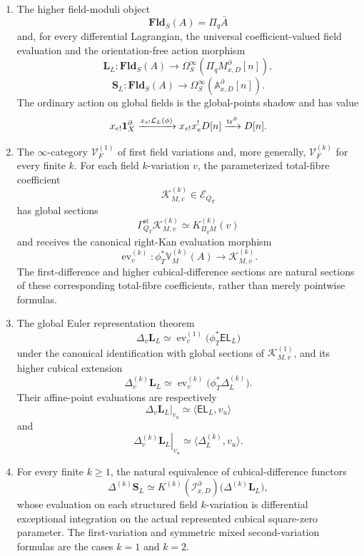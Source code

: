 \begin{theorem}
\begin{enumerate}
\item The higher field-moduli object
\[
    \mathbf{Fld}_S(A)=\Pi_q\bar A
\]
and, for every differential Lagrangian, the universal coefficient-valued field evaluation and the orientation-free action morphism
\[
    \mathbf L_L:
    \mathbf{Fld}_S(A)
    \to
    \Omega_S^\infty(\Pi_qM^\partial_{x,D}[n]),
\]
\[
    \boxed{
    \mathbf S_L:
    \mathbf{Fld}_S(A)
    \to
    \Omega_S^\infty(\mathbb A^\partial_{x,D}[n]).
    }
\]
The ordinary action on global fields is the global-points shadow and has value
\[
    x_{e!}\mathbf 1_X^\partial
    \xrightarrow{x_{e!}\mathcal L_L(\phi)}
    x_{e!}x_e^!D[n]
    \xrightarrow{\operatorname{tr}^\partial}
    D[n].
\]

\item The \(\infty\)-category \(\mathcal V_F^{(1)}\) of first field variations and, more generally, \(\mathcal V_F^{(k)}\) for every finite \(k\). For each field \(k\)-variation \(v\), the parameterized total-fibre coefficient
\[
    \mathscr K^{(k)}_{M,v}
    \in
    \mathcal E_{Q_T}
\]
has global sections
\[
    \Gamma_{Q_T}^{\mathrm{st}}\mathscr K^{(k)}_{M,v}
    \simeq
    K_{\Pi_qM}^{(k)}(v)
\]
and receives the canonical right-Kan evaluation morphism
\[
    \operatorname{ev}^{(k)}_v:
    \phi_T^*\mathbb V_M^{(k)}(A)
    \longrightarrow
    \mathscr K^{(k)}_{M,v}.
\]
The first-difference and higher cubical-difference sections are natural sections of these corresponding total-fibre coefficients, rather than merely pointwise formulas.

\item The global Euler representation theorem
\[
    \Delta_v\mathbf L_L
    \simeq
    \operatorname{ev}^{(1)}_v
    \bigl(\phi_T^*\mathsf{EL}_L\bigr)
\]
under the canonical identification with global sections of \(\mathscr K^{(1)}_{M,v}\), and its higher cubical extension
\[
    \Delta_v^{(k)}\mathbf L_L
    \simeq
    \operatorname{ev}^{(k)}_v
    \bigl(\phi_T^*\Delta_L^{(k)}\bigr).
\]
Their affine-point evaluations are respectively
\[
    \left.\Delta_v\mathbf L_L\right|_{v_u}
    \simeq
    \langle\mathsf{EL}_L,v_u\rangle
\]
and
\[
    \left.\Delta_v^{(k)}\mathbf L_L\right|_{v_u}
    \simeq
    \langle\Delta_L^{(k)},v_u\rangle.
\]

\item For every finite \(k\ge1\), the natural equivalence of cubical-difference functors
\[
    \boxed{
    \Delta^{(k)}\mathbf S_L
    \simeq
    K^{(k)}(\mathcal I^\partial_{x,D})
    \bigl(\Delta^{(k)}\mathbf L_L\bigr),
    }
\]
whose evaluation on each structured field \(k\)-variation is differential exceptional integration on the actual represented cubical square-zero parameter. The first-variation and symmetric mixed second-variation formulas are the cases \(k=1\) and \(k=2\).


\end{enumerate}
\end{theorem}

